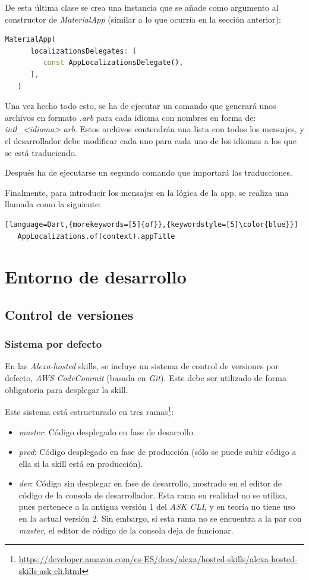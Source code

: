 \documentclass[11pt,spanish,listoffigures,listoftables,table,hyphens,dvipsnames]{tfgetsinf}
\begin{document}
De esta última clase se crea una instancia que se añade como argumento al constructor de \emph{MaterialApp} (similar a lo que ocurría en la sección anterior):

\begin{lstlisting}[language=Dart]
   MaterialApp(
      localizationsDelegates: [
         const AppLocalizationsDelegate(),
      ],
   )
\end{lstlisting}

Una vez hecho todo esto, se ha de ejecutar un comando que generará unos archivos en formato \emph{.arb} para cada idioma con nombres en forma de: \emph{intl\_<idioma>.arb}. Estos archivos contendrán una lista con todos los mensajes, y el desarrollador debe modificar cada uno para cada uno de los idiomas a los que se está traduciendo.

Después ha de ejecutarse un segundo comando que importará las traducciones.

Finalmente, para introducir los mensajes en la lógica de la app, se realiza una llamada como la siguiente:

\begin{lstlisting}[language=Dart,{morekeywords=[5]{of}},{keywordstyle=[5]\color{blue}}]
   AppLocalizations.of(context).appTitle
\end{lstlisting}

\section{Entorno de desarrollo}

\subsection{Control de versiones}

\subsubsection{Sistema por defecto}

En las \emph{Alexa-hosted} skills, se incluye un sistema de control de versiones por defecto, \emph{AWS CodeCommit} (basada en \emph{Git}). Este debe ser utilizado de forma obligatoria para desplegar la skill.

Este sistema está estructurado en tres ramas\footnote{\url{https://developer.amazon.com/es-ES/docs/alexa/hosted-skills/alexa-hosted-skills-ask-cli.html}}:

\begin{itemize}
   \item \emph{master}: Código desplegado en fase de desarrollo.
   \item \emph{prod}: Código desplegado en fase de producción (sólo se puede subir código a ella si la skill está en producción).
   \item \emph{dev}: Código sin desplegar en fase de desarrollo, mostrado en el editor de código de la consola de desarrollador. Esta rama en realidad no se utiliza, pues pertenece a la antigua versión 1 del \emph{ASK CLI}, y en teoría no tiene uso en la actual versión 2. Sin embargo, si esta rama no se encuentra a la par con \emph{master}, el editor de código de la consola deja de funcionar.
\end{itemize}
\end{document}
